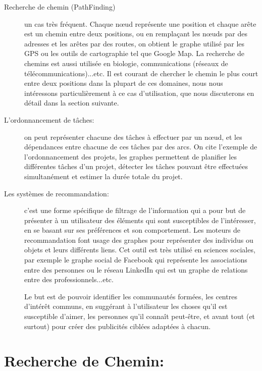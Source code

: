 \begin{description}


\item[Recherche de chemin (PathFinding)]
un cas très fréquent. Chaque nœud représente une position et chaque arête est un chemin entre deux positions, ou en remplaçant les nœuds par des adresses et les arêtes par des routes, on obtient le graphe utilisé par les GPS ou les outils de cartographie tel que Google Map.
La recherche de chemins est aussi utilisée en biologie, communications (réseaux de télécommunications)...etc.
Il est courant de chercher le chemin le plus court entre deux positions dans la plupart de ces domaines, nous nous intéressons particulièrement à ce cas d'utilisation, que nous discuterons en détail dans la section suivante.


\item[L'ordonnancement de tâches:]
on peut représenter chacune des tâches à effectuer par un nœud, et les dépendances entre chacune de ces tâches par des arcs.
On cite l'exemple de l'ordonnancement des projets, les graphes permettent de planifier les différentes tâches d'un projet, détecter les tâches pouvant être effectuées simultanément et estimer la durée totale du projet.

\item[Les systèmes de recommandation:]
c'est une forme spécifique de filtrage de l'information qui a pour but de présenter à un utilisateur des éléments qui sont susceptibles de l'intéresser, en se basant sur ses préférences et son comportement.
Les moteurs de recommandation font usage des graphes pour représenter des individus ou objets et leurs différents liens. Cet outil est très utilisé en sciences sociales, par exemple le graphe social de Facebook qui représente les associations entre des personnes ou le réseau LinkedIn qui est un graphe de relations entre des professionnels...etc.

Le but est de pouvoir identifier les communautés formées, les centres d'intérêt communs, en suggérant à l'utilisateur les choses qu'il est susceptible d'aimer, les personnes qu'il connaît peut-être, et avant tout (et surtout) pour créer des publicités ciblées adaptées à chacun.

\end{description}

\section{Recherche de Chemin:}

